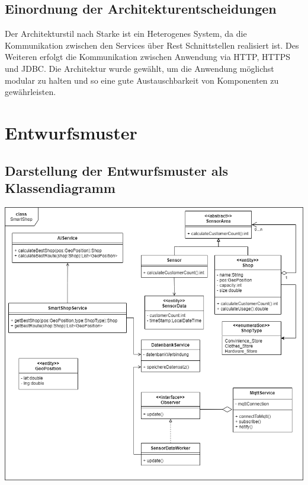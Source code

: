 \documentclass[runningheads]{llncs}
\begin{document}
\subsection{Einordnung der Architekturentscheidungen}
Der Architekturstil nach Starke ist ein Heterogenes System, da die Kommunikation zwischen den Services über Rest Schnittstellen realisiert ist.
Des Weiteren erfolgt die Kommunikation zwischen Anwendung via HTTP, HTTPS und JDBC.
Die Architektur wurde gewählt, um die Anwendung möglichst modular zu halten und so eine gute Austauschbarkeit von Komponenten zu gewährleisten.

\newpage
\section{Entwurfsmuster}

\subsection{Darstellung der Entwurfsmuster als Klassendiagramm}
\includegraphics[width=\linewidth]{images/OOD-Klassendiagram}
\end{document}

